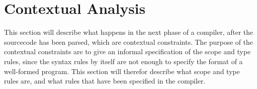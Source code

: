 \section{Contextual Analysis} \label{chap:contextual_analysis}

This section will describe what happens in the next phase of a compiler, 
after the sourcecode has been parsed, which are contextual constraints.
The purpose of the contextual constraints are to give an informal 
specification of the scope and type rules, since the syntax rules by itself
are not enough to specify the format of a well-formed program. This section
will therefor describe what scope and type rules are, and what rules that have 
been specified in the compiler.

